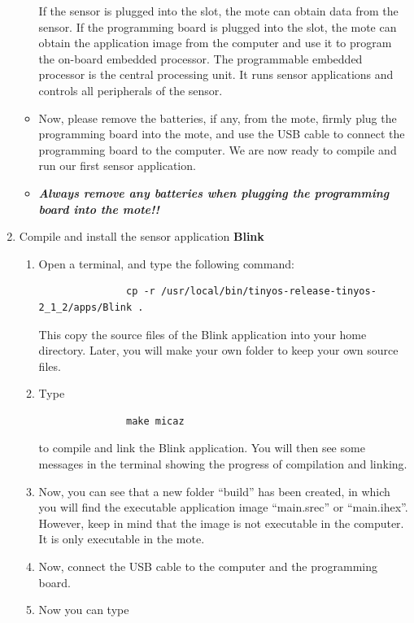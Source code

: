 \documentclass[letterpaper,12pt]{article}
\begin{document}
\begin{enumerate}
\begin{itemize}
               If the sensor is plugged into the slot, the mote can obtain data from the
               sensor. If the programming board is plugged into the slot, the mote can
               obtain the application image from the computer and use it to program the on-board
               embedded processor. The programmable embedded processor is the central
               processing unit. It runs sensor applications and controls all peripherals
               of the sensor.
         \item Now, please remove the batteries, if any, from the mote, firmly plug the programming
               board into the mote, and use the USB cable to connect the programming board
               to the computer. We are now ready to compile and run our first sensor application.
         \item \emph{\textbf{Always remove any batteries when plugging the programming board into the mote!!}}
      \end{itemize}
   \item Compile and install the sensor application \textbf{Blink}
      \begin{enumerate}
         \item Open a terminal, and type the following command:
               \begin{lstlisting}
               cp -r /usr/local/bin/tinyos-release-tinyos-2_1_2/apps/Blink .
               \end{lstlisting}
               This copy the source files of the Blink application into your home directory.
               Later, you will make your own folder to keep your own source files.
         \item Type 
               \begin{lstlisting}
               make micaz
               \end{lstlisting}
               to compile and link the Blink application. You will then see some messages in
               the terminal showing the progress of compilation and linking.
         \item Now, you can see that a new folder “build” has been created, in
               which you will find the executable application image “main.srec” or “main.ihex”.
               However, keep in mind that the image is not executable in the computer.
               It is only executable in the mote.
         \item Now, connect the USB cable to the computer and the programming board.
         \item Now you can type

\end{enumerate}
\end{enumerate}
\end{document}

